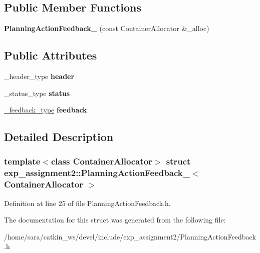 \subsection*{Public Member Functions}
\begin{DoxyCompactItemize}
\item 
\mbox{\label{structexp__assignment2_1_1PlanningActionFeedback___a3802ef150d6c091a3b0373b883c8c223}} 
{\bfseries Planning\+Action\+Feedback\+\_\+} (const Container\+Allocator \&\+\_\+alloc)
\end{DoxyCompactItemize}
\subsection*{Public Attributes}
\begin{DoxyCompactItemize}
\item 
\mbox{\label{structexp__assignment2_1_1PlanningActionFeedback___a1765bb3ed71044c08579292fea2c05df}} 
\+\_\+header\+\_\+type {\bfseries header}
\item 
\mbox{\label{structexp__assignment2_1_1PlanningActionFeedback___aa494c84a2cba6ddb99d4e573f2c69f5f}} 
\+\_\+status\+\_\+type {\bfseries status}
\item 
\mbox{\label{structexp__assignment2_1_1PlanningActionFeedback___a8dd4625cd7d5f13a3510bc0b10d0e017}} 
\hyperlink{structexp__assignment2_1_1PlanningFeedback__}{\+\_\+feedback\+\_\+type} {\bfseries feedback}
\end{DoxyCompactItemize}


\subsection{Detailed Description}
\subsubsection*{template$<$class Container\+Allocator$>$\newline
struct exp\+\_\+assignment2\+::\+Planning\+Action\+Feedback\+\_\+$<$ Container\+Allocator $>$}



Definition at line 25 of file Planning\+Action\+Feedback.\+h.



The documentation for this struct was generated from the following file\+:\begin{DoxyCompactItemize}
\item 
/home/sara/catkin\+\_\+ws/devel/include/exp\+\_\+assignment2/Planning\+Action\+Feedback.\+h\end{DoxyCompactItemize}
